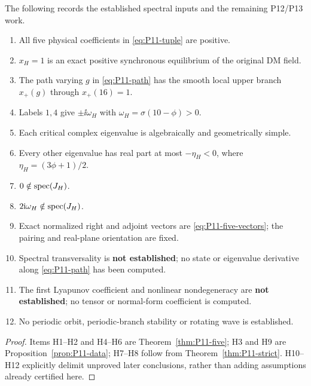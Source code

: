 \begin{proposition}
\label{prop:P11-ledger}
The following records the established spectral inputs and the remaining P12/P13 work.
\begin{enumerate}[label=H\arabic*.,leftmargin=3em]
 \item All five physical coefficients in \eqref{eq:P11-tuple} are positive.
 \item $x_H=1$ is an exact positive synchronous equilibrium of the original DM field.
 \item The path varying $g$ in \eqref{eq:P11-path} has the smooth local
       upper branch $x_+(g)$ through $x_+(16)=1$.
 \item Labels $1,4$ give $\pm\ii\omega_H$ with $\omega_H=\sigma(10-\phi)>0$.
 \item Each critical complex eigenvalue is algebraically and geometrically simple.
 \item Every other eigenvalue has real part at most $-\eta_H<0$,
       where $\eta_H=(3\phi+1)/2$.
 \item $0\notin\operatorname{spec}(J_H)$.
 \item $2\mathrm{i}\omega_H\notin\operatorname{spec}(J_H)$.
 \item Exact normalized right and adjoint vectors are \eqref{eq:P11-five-vectors};
       the pairing and real-plane orientation are fixed.
 \item Spectral transversality is \textbf{not established}; no state or
       eigenvalue derivative along \eqref{eq:P11-path} has been computed.
 \item The first Lyapunov coefficient and nonlinear nondegeneracy are
       \textbf{not established}; no tensor or normal-form coefficient is computed.
 \item No periodic orbit, periodic-branch stability or rotating wave is established.
\end{enumerate}
\end{proposition}
\begin{proof}
Items H1--H2 and H4--H6 are Theorem~\ref{thm:P11-five}; H3 and
H9 are Proposition~\ref{prop:P11-data}; H7--H8 follow from
Theorem~\ref{thm:P11-strict}. H10--H12 explicitly delimit unproved
later conclusions, rather than adding assumptions already certified here.
\end{proof}
